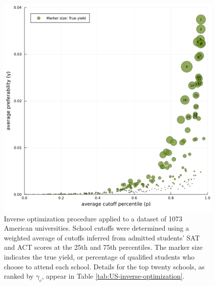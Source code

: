 \documentclass[12pt]{article}
\numberwithin{equation}{subsection}
\theoremstyle{definition}
\begin{document}
\begin{figure}
\begin{center}\includegraphics[width=\linewidth, ]{singlescoreplots/US-cutoff-gamma.pdf}\end{center}
\captionsetup{singlelinecheck=off}
    \caption[.]{Inverse optimization procedure applied to a dataset of 1073 American universities. School cutoffs were determined using a weighted average of cutoffs inferred from admitted students' SAT and ACT scores at the 25th and 75th percentiles. The marker size indicates the true yield, or percentage of qualified students who choose to attend each school. Details for the top twenty schools, as ranked by $\gamma_c$, appear in Table \ref{tab:US-inverse-optimization}.}
\label{US-cutoff-gamma}
\end{figure}
\end{document}
